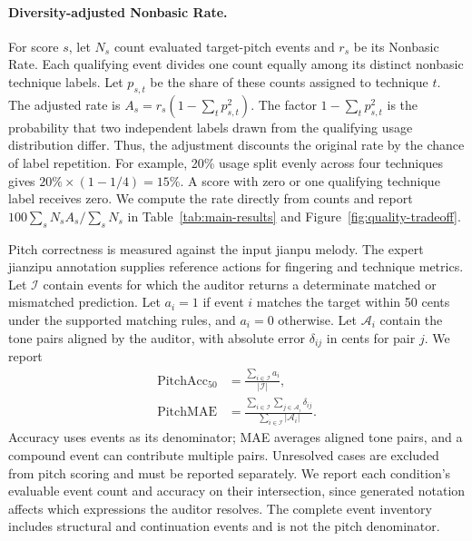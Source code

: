 \paragraph{Diversity-adjusted Nonbasic Rate.}\label{sec:technique-breadth}
For score $s$, let $N_s$ count evaluated target-pitch events and $r_s$ be its Nonbasic Rate. Each qualifying event divides one count equally among its distinct nonbasic technique labels. Let $p_{s,t}$ be the share of these counts assigned to technique $t$. The adjusted rate is $A_s=r_s(1-\sum_t p_{s,t}^2)$. The factor $1-\sum_t p_{s,t}^2$ is the probability that two independent labels drawn from the qualifying usage distribution differ. Thus, the adjustment discounts the original rate by the chance of label repetition. For example, 20\% usage split evenly across four techniques gives $20\%\times(1-1/4)=15\%$. A score with zero or one qualifying technique label receives zero. We compute the rate directly from counts and report $100\sum_s N_s A_s/\sum_s N_s$ in Table~\ref{tab:main-results} and Figure~\ref{fig:quality-tradeoff}.



Pitch correctness is measured against the input jianpu melody. The expert jianzipu annotation supplies reference actions for fingering and technique metrics. Let $\mathcal I$ contain events for which the auditor returns a determinate matched or mismatched prediction. Let $a_i=1$ if event $i$ matches the target within 50 cents under the supported matching rules, and $a_i=0$ otherwise. Let $\mathcal A_i$ contain the tone pairs aligned by the auditor, with absolute error $\delta_{ij}$ in cents for pair $j$. We report
\begin{equation}
\begin{aligned}
\mathrm{PitchAcc}_{50}
&=\frac{\sum_{i\in\mathcal I}a_i}{|\mathcal I|},\\
\mathrm{PitchMAE}
&=\frac{\sum_{i\in\mathcal I}\sum_{j\in\mathcal A_i}\delta_{ij}}
{\sum_{i\in\mathcal I}|\mathcal A_i|}.
\end{aligned}
\label{eq:pitch-metrics}
\end{equation}
Accuracy uses events as its denominator; MAE averages aligned tone pairs, and a compound event can contribute multiple pairs. Unresolved cases are excluded from pitch scoring and must be reported separately. We report each condition's evaluable event count and accuracy on their intersection, since generated notation affects which expressions the auditor resolves. The complete event inventory includes structural and continuation events and is not the pitch denominator.

